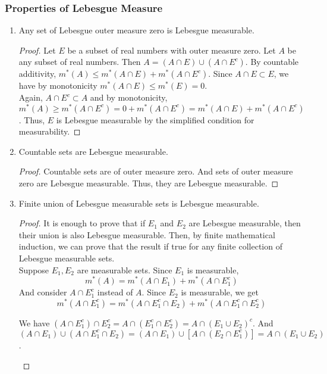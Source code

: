 \subsubsection{Properties of Lebesgue Measure}
\begin{enumerate}
	\item Any set of Lebesgue outer measure zero is Lebesgue measurable.
	\begin{proof}
		Let $E$ be a subset of real numbers with outer measure zero. Let $A$ be any subset of real numbers. Then $A = (A \cap E) \cup (A \cap E^c)$. By countable additivity, $m^\ast(A) \le m^\ast(A \cap E) + m^\ast(A \cap E^c)$. Since $A\cap E \subset E$, we have by monotonicity $m^\ast(A \cap E) \le m^\ast(E) = 0$.\\

		Again, $A \cap E^c \subset A$ and by monotonicity, $m^\ast(A) \ge m^\ast(A \cap E^c) = 0+m^\ast(A \cap E^c) = m^\ast(A\cap E) + m^\ast(A \cap E^c)$. Thus, $E$ is Lebesgue measurable by the simplified condition for measurability.
	\end{proof}

	\item Countable sets are Lebesgue measurable.
	\begin{proof}
		Countable sets are of outer measure zero. And sets of outer measure zero are Lebesgue measurable. Thus, they are Lebesgue measurable.
	\end{proof}
	\item Finite union of Lebesgue measurable sets is Lebesgue measurable.
	\begin{proof}
		It is enough to prove that if $E_1$ and $E_2$ are Lebesgue measurable, then their union is also Lebesgue measurable. Then, by finite mathematical induction, we can prove that the result if true for any finite collection of Lebesgue measurable sets.\\

	Suppose $E_1, E_2$ are measurable sets. Since $E_1$ is measurable,
	\begin{equation}
		m^\ast(A) = m^\ast(A \cap E_1) + m^\ast(A \cap E_1^c)
	\end{equation}
		And consider $A \cap E_1^c$ instead of $A$. Since $E_2$ is measurable, we get
	\begin{equation}
		m^\ast(A \cap E_1^c) = m^\ast(A \cap E_1^c\cap  E_2) + m^\ast(A \cap E_1^c \cap E_2^c)
	\end{equation}

		We have $(A \cap E_1^c) \cap E_2^c = A \cap (E_1^c \cap E_2^c) = A \cap (E_1 \cup E_2)^c$. And $(A \cap E_1) \cup (A \cap E_1^c \cap E_2) = (A \cap E_1) \cup [A \cap (E_2 \cap E_1^c)] = A \cap (E_1 \cup E_2)$.
\begin{center}
\end{center}
\end{proof}
\end{enumerate}
